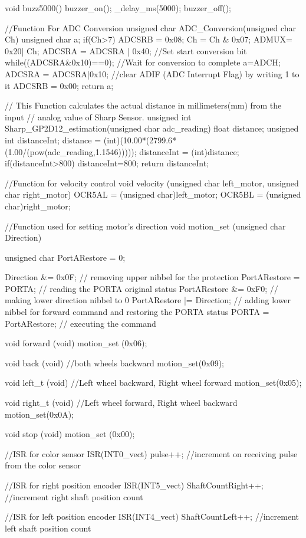 void buzz5000()
{
	buzzer_on();
	_delay_ms(5000);
	buzzer_off();
}

//Function For ADC Conversion
unsigned char ADC_Conversion(unsigned char Ch)
{
	unsigned char a;
	if(Ch>7)
	{
		ADCSRB = 0x08;
	}
	Ch = Ch & 0x07;
	ADMUX= 0x20| Ch;
	ADCSRA = ADCSRA | 0x40;		//Set start conversion bit
	while((ADCSRA&0x10)==0);	//Wait for conversion to complete
	a=ADCH;
	ADCSRA = ADCSRA|0x10; //clear ADIF (ADC Interrupt Flag) by writing 1 to it
	ADCSRB = 0x00;
	return a;
}

// This Function calculates the actual distance in millimeters(mm) from the input
// analog value of Sharp Sensor.
unsigned int Sharp_GP2D12_estimation(unsigned char adc_reading)
{
	float distance;
	unsigned int distanceInt;
	distance = (int)(10.00*(2799.6*(1.00/(pow(adc_reading,1.1546)))));
	distanceInt = (int)distance;
	if(distanceInt>800)
	{
		distanceInt=800;
	}
	return distanceInt;
}


//Function for velocity control
void velocity (unsigned char left_motor, unsigned char right_motor)
{
	OCR5AL = (unsigned char)left_motor;
	OCR5BL = (unsigned char)right_motor;
}

//Function used for setting motor's direction
void motion_set (unsigned char Direction)
{
	unsigned char PortARestore = 0;

	Direction &= 0x0F; 		// removing upper nibbel for the protection
	PortARestore = PORTA; 		// reading the PORTA original status
	PortARestore &= 0xF0; 		// making lower direction nibbel to 0
	PortARestore |= Direction; // adding lower nibbel for forward command and restoring the PORTA status
	PORTA = PortARestore; 		// executing the command
}

void forward (void)
{
	motion_set (0x06);
}

void back (void) //both wheels backward
{
	motion_set(0x09);
}

void left_t (void) //Left wheel backward, Right wheel forward
{
	motion_set(0x05);
}

void right_t (void) //Left wheel forward, Right wheel backward
{
	motion_set(0x0A);
}

void stop (void)
{
	motion_set (0x00);
}

//ISR for color sensor
ISR(INT0_vect)
{
	pulse++; //increment on receiving pulse from the color sensor
}

//ISR for right position encoder
ISR(INT5_vect)
{
	ShaftCountRight++;  //increment right shaft position count
}

//ISR for left position encoder
ISR(INT4_vect)
{
	ShaftCountLeft++;  //increment left shaft position count
}

